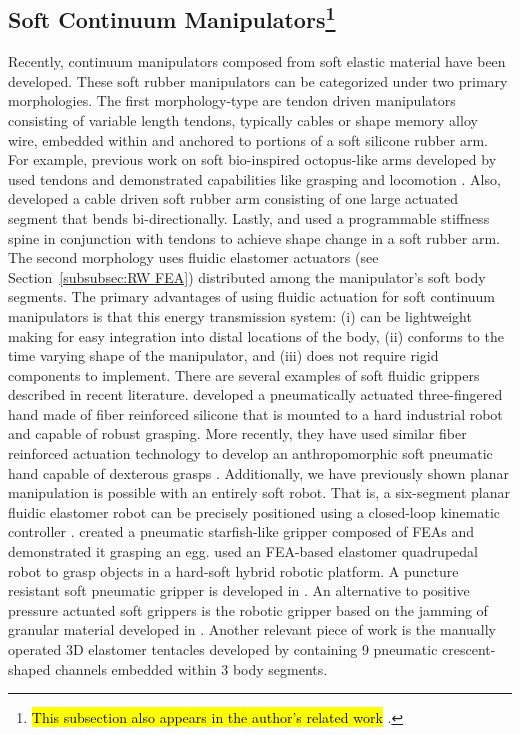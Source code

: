 \subsection[Soft Continuum Manipulators]{Soft Continuum Manipulators\footnote{\hl{This subsection also appears in the author's related work} \citet{marchese2015design}.}}
Recently, continuum manipulators composed from soft elastic material have been developed.
These soft rubber manipulators can be categorized under two primary morphologies.
The first morphology-type are tendon driven manipulators consisting of variable length tendons, typically cables or shape memory alloy wire, embedded within and anchored to portions of a soft silicone rubber arm.
For example, previous work on soft bio-inspired octopus-like arms developed by \citet{calisti2010study} used tendons and demonstrated capabilities like grasping and locomotion \citep{laschi2012soft, calisti2011octopus}.
Also, \citet{wang2013visual} developed a cable driven soft rubber arm consisting of one large actuated segment that bends bi-directionally.
Lastly, \citet{mcevoy14shape} and \citet{mcevoy2014thermoplastic} used a programmable stiffness spine in conjunction with tendons to achieve shape change in a soft rubber arm.
The second morphology uses fluidic elastomer actuators (see Section~\ref{subsubsec:RW FEA}) distributed among the manipulator's soft body segments.
The primary advantages of using fluidic actuation for soft continuum manipulators is that this energy transmission system: (i) can be lightweight making for easy integration into distal locations of the body, (ii) conforms to the time varying shape of the manipulator, and (iii) does not require rigid components to implement.
There are several examples of soft fluidic grippers described in recent literature.
\citet{deimel2013compliant} developed a pneumatically actuated three-fingered hand made of fiber reinforced silicone that is mounted to a hard industrial robot and capable of robust grasping.
More recently, they have used similar fiber reinforced actuation technology to develop an anthropomorphic soft pneumatic hand capable of dexterous grasps \citep{deimel2014novel}.
Additionally, we have previously shown planar manipulation is possible with an entirely soft robot. That is, a six-segment planar fluidic elastomer robot can be precisely positioned using a closed-loop kinematic controller \citep{marchese2014design, marchese2014whole, katzschmann2015autonomous}.
\citet{ilievski2011soft} created a pneumatic starfish-like gripper composed of FEAs and demonstrated it grasping an egg.
\citet{Stokes2014hybrid} used an FEA-based elastomer quadrupedal robot to grasp objects in a hard-soft hybrid robotic platform.
A puncture resistant soft pneumatic gripper is developed in \citet{shepherd2013soft}.
An alternative to positive pressure actuated soft grippers is the robotic gripper based on the jamming of granular material developed in \citet{brown2010universal}.
Another relevant piece of work is the manually operated 3D elastomer tentacles developed by \citet{martinez2013robotic} containing 9 pneumatic crescent-shaped channels embedded within 3 body segments.

